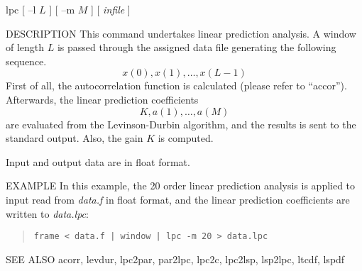 
\begin{synopsis}
\item [lpc] [ --l $L$ ] [ --m $M$ ] [ {\em infile} ] 
\end{synopsis}

\begin{qsection}{DESCRIPTION}
This command undertakes linear prediction analysis.
A window of length $L$ is passed through the assigned
data file generating the following sequence.
\begin{displaymath}
  x(0),x(1),\ldots,x(L-1)
\end{displaymath}
First of all, the autocorrelation function is
calculated (please refer to ``accor'').
Afterwards, the linear prediction coefficients
\begin{displaymath}
  K, a(1), \ldots, a(M)
\end{displaymath}
are evaluated from the Levinson-Durbin algorithm,
and the results is sent to the standard output.
Also, the gain $K$ is computed.
\par
Input and output data are in float format.
\end{qsection}

\begin{options}
\end{options}

\begin{qsection}{EXAMPLE}
In this example, the 20 order linear prediction analysis is applied
to input read from {\em data.f} in float format,
and the linear prediction coefficients are written to
{\em data.lpc}:
\begin{quote}
 \verb!frame < data.f | window | lpc -m 20 > data.lpc!
\end{quote} 
\end{qsection}

\begin{qsection}{SEE ALSO}
 acorr, levdur, lpc2par, par2lpc, lpc2c, lpc2lsp, lsp2lpc, 
 ltcdf, lspdf
\end{qsection}
